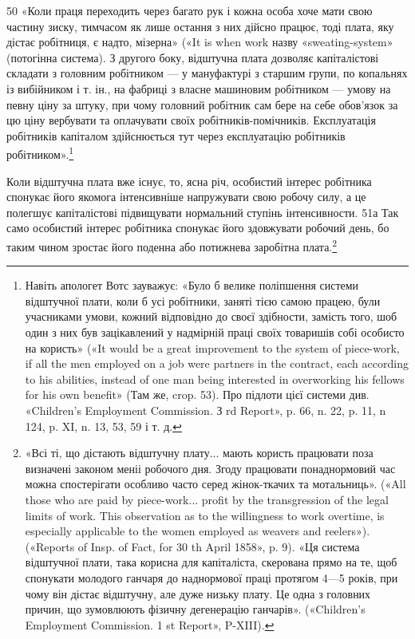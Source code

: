 50 «Коли праця переходить через багато рук і кожна особа хоче
мати свою частину зиску, тимчасом як лише остання з них дійсно працює,
тоді плата, яку дістає робітниця, є надто, мізерна» («It is when work
назву «sweating-system» (потогінна система). З другого боку,
відштучна плата дозволяє капіталістові складати з головним робітником
— у мануфактурі з старшим групи, по копальнях із
вибійником і т. ін., на фабриці з власне машиновим робітником —
умову на певну ціну за штуку, при чому головний робітник сам
бере на себе обов’язок за цю ціну вербувати та оплачувати своїх
робітників-помічників. Експлуатація робітників капіталом здійснюється
тут через експлуатацію робітників робітником».\footnote{
Навіть апологет Вотс зауважує: «Було б велике поліпшення
системи відштучної плати, коли б усі робітники, заняті тією самою працею,
були учасниками умови, кожний відповідно до своєї здібности, замість
того, шоб один з них був зацікавлений у надмірній праці своїх
товаришів собі особисто на користь» («It would be a great improvement
to the system of piece-work, if all the men employed on a job were partners
in the contract, each according to his abilities, instead of one man
being interested in overworking his fellows for his own benefit» (Там же,
crop. 53). Про підлоти цієї системи див. «Children’s Employment Commission.
З rd Report», p. 66, n. 22, p. 11, n 124, p. XI, n. 13, 53, 59 і т. д.
}

Коли відштучна плата вже існує, то, ясна річ, особистий інтерес
робітника спонукає його якомога інтенсивніше напружувати
свою робочу силу, а це полегшує капіталістові підвищувати нормальний
ступінь інтенсивности. 51а Так само особистий інтерес
робітника спонукає його здовжувати робочий день, бо таким
чином зростає його поденна або потижнева заробітна плата.\footnote{
«Всі ті, що дістають відштучну плату... мають користь працювати
поза визначені законом меніі робочого дня. Згоду працювати понаднормовий
час можна спостерігати особливо часто серед жінок-ткачих та мотальниць».
(«All those who are paid by piece-work... profit by the transgression
of the legal limits of work. This observation as to the willingness
to work overtime, is especially applicable to the women employed as weavers
and reelers»). («Reports of Insp. of Fact, for 30 th April 1858», p. 9).
«Ця система відштучної плати, така корисна для капіталіста, скерована
прямо на те, щоб спонукати молодого ганчаря до наднормової праці
протягом 4—5 років, при чому він дістає відштучну, але дуже низьку плату.
Це одна з головних причин, що зумовлюють фізичну дегенерацію ганчарів».
(«Children’s Employment Commission. 1 st Report», P-XIII).
}

